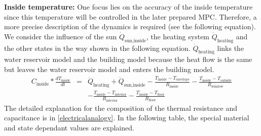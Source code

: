     \textbf{Inside temperature:}\newline
    One focus lies on the accuracy of the inside temperature since this temperature will be controlled in the later prepared MPC. Therefore, a more precise description of the dynamics is required (see the following equation). We consider the influence of the sun $\dot{Q}_\text{sun,inside}$, the heating system $\dot{Q}_\text{heating}$ and the other states in the way shown in the following equation. $\dot{Q}_\text{heating}$  links the water reservoir model and the building model because the heat flow is the same but leaves the water reservoir model and enters the building model. 
    \begin{align}
        \label{eq:1.state}
        C_\text{inside}*\frac{d T_\text{inside}}{d t} &=& \dot{Q}_\text{heating} + \dot{Q}_\text{sun,inside} - \frac{T_\text{inside}-T_\text{envelope}}{R_\text{inside}} - \frac{T_\text{inside}-T_\text{outside}}{R_\text{window}} \\
       & &-\frac{T_\text{inside}-T_\text{interior}}{R_\text{interior}}-\frac{T_\text{inside}-T_\text{floor}}{R_\text{floor}}\nonumber
    \end{align}
    The detailed explanation for the composition of the thermal resistance and capacitance is in \autoref{electricalanalogy}. In the following table, the special material and state dependant values are explained.
